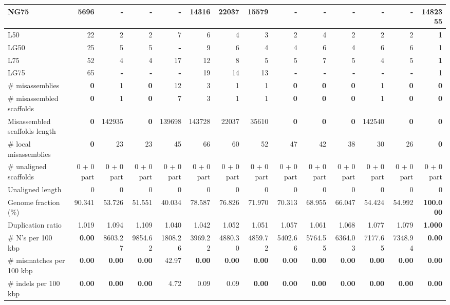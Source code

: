 \documentclass[12pt, twocolumn]{article}
\begin{document}
\begin{table}[ht]
\begin{center}
{\begin{tabular}{|l*{13}{|r}|}
NG75 & 5696 & - & - & - & 14316 & 22037 & 15579 & - & - & - & - & - & {\bf 1482355} \\ \hline
L50 & 22 & 2 & 2 & 7 & 6 & 4 & 3 & 2 & 4 & 2 & 2 & 2 & {\bf 1} \\ \hline
LG50 & 25 & 5 & 5 & {\bf -} & 9 & 6 & 4 & 4 & 6 & 4 & 6 & 6 & 1 \\ \hline
L75 & 52 & 4 & 4 & 17 & 12 & 8 & 5 & 5 & 7 & 5 & 4 & 5 & {\bf 1} \\ \hline
LG75 & 65 & {\bf -} & {\bf -} & {\bf -} & 19 & 14 & 13 & {\bf -} & {\bf -} & {\bf -} & {\bf -} & {\bf -} & 1 \\ \hline
\# misassemblies & {\bf 0} & 1 & {\bf 0} & 12 & 3 & 1 & 1 & {\bf 0} & {\bf 0} & {\bf 0} & 1 & {\bf 0} & {\bf 0} \\ \hline
\# misassembled scaffolds & {\bf 0} & 1 & {\bf 0} & 7 & 3 & 1 & 1 & {\bf 0} & {\bf 0} & {\bf 0} & 1 & {\bf 0} & {\bf 0} \\ \hline
Misassembled scaffolds length & {\bf 0} & 142935 & {\bf 0} & 139698 & 143728 & 22037 & 35610 & {\bf 0} & {\bf 0} & {\bf 0} & 142540 & {\bf 0} & {\bf 0} \\ \hline
\# local misassemblies & {\bf 0} & 23 & 23 & 45 & 66 & 60 & 52 & 47 & 42 & 38 & 30 & 26 & {\bf 0} \\ \hline
\# unaligned scaffolds & 0 + 0 part & 0 + 0 part & 0 + 0 part & 0 + 0 part & 0 + 0 part & 0 + 0 part & 0 + 0 part & 0 + 0 part & 0 + 0 part & 0 + 0 part & 0 + 0 part & 0 + 0 part & 0 + 0 part \\ \hline
Unaligned length & 0 & 0 & 0 & 0 & 0 & 0 & 0 & 0 & 0 & 0 & 0 & 0 & 0 \\ \hline
Genome fraction (\%) & 90.341 & 53.726 & 51.551 & 40.034 & 78.587 & 76.826 & 71.970 & 70.313 & 68.955 & 66.047 & 54.424 & 54.992 & {\bf 100.000} \\ \hline
Duplication ratio & 1.019 & 1.094 & 1.109 & 1.040 & 1.042 & 1.052 & 1.051 & 1.057 & 1.061 & 1.068 & 1.077 & 1.079 & {\bf 1.000} \\ \hline
\# N's per 100 kbp & {\bf 0.00} & 8603.27 & 9854.62 & 1808.26 & 3969.22 & 4880.30 & 4859.72 & 5402.66 & 5764.55 & 6364.03 & 7177.65 & 7348.94 & {\bf 0.00} \\ \hline
\# mismatches per 100 kbp & {\bf 0.00} & {\bf 0.00} & {\bf 0.00} & 42.97 & {\bf 0.00} & {\bf 0.00} & {\bf 0.00} & {\bf 0.00} & {\bf 0.00} & {\bf 0.00} & {\bf 0.00} & {\bf 0.00} & {\bf 0.00} \\ \hline
\# indels per 100 kbp & {\bf 0.00} & {\bf 0.00} & {\bf 0.00} & 4.72 & 0.09 & 0.09 & {\bf 0.00} & {\bf 0.00} & {\bf 0.00} & {\bf 0.00} & {\bf 0.00} & {\bf 0.00} & {\bf 0.00} \\ \hline

\end{tabular}}
\end{center}
\end{table}
\end{document}
